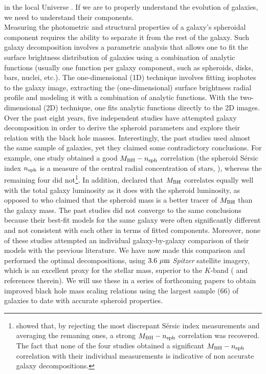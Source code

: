 \documentclass[preprint2]{emulateapj}
\begin{document}
in the local Universe \citep{GDS2015}.
If we are to properly understand the evolution of galaxies, we need to understand their components.\\
Measuring the photometric and structural properties of a galaxy's spheroidal component requires the ability to 
separate it from the rest of the galaxy. 
Such galaxy decomposition involves a parametric analysis that allows one to fit the surface brightness distribution
of galaxies using a combination of analytic functions (usually one function per
galaxy component, such as spheroids, disks, bars, nuclei, etc.).
The one-dimensional (1D) technique involves fitting isophotes to the galaxy image, extracting the (one-dimensional) surface 
brightness radial profile and modeling it with a combination of analytic functions.
With the two-dimensional (2D) technique, one fits analytic functions directly to the 2D images. \\
Over the past eight years, five independent studies 
\citep{grahamdriver2007,sani2011,vika2012,beifiori2012,lasker2014data,lasker2014anal} have attempted galaxy decomposition
in order to derive the spheroid parameters and explore their relation with the black hole masses. 
Interestingly, the past studies used almost the same sample of galaxies, yet they claimed some contradictory conclusions.
For example, one study \citep{grahamdriver2007} obtained a good $M_{\rm BH}-n_{\rm sph}$ correlation 
(the spheroid S\'ersic index $n_{\rm sph}$ is a measure of the central radial concentration of stars, \citealt{trujillo2001}), 
whereas the remaining four did not\footnote{\cite{savorgnan2013} showed that, 
by rejecting the most discrepant S\'ersic index measurements and averaging the remaning ones, 
a strong $M_{\rm BH}-n_{\rm sph}$ correlation was recovered. 
The fact that none of the four studies obtained a significant $M_{\rm BH}-n_{\rm sph}$ correlation with their individual measurements 
is indicative of non accurate galaxy decompositions. }.
In addition, \cite{lasker2014anal} 
declared that $M_{\rm BH}$ correlates equally well with the total galaxy luminosity as it does with the spheroid luminosity, 
as opposed to \cite{beifiori2012} who claimed that the spheroid mass is a better tracer of $M_{\rm BH}$ than the galaxy mass.
The past studies did not converge to the same conclusions 
because their best-fit models for the same galaxy were often 
significantly different and not consistent with each other in terms of fitted components. 
Moreover, none of these studies attempted an individual galaxy-by-galaxy 
comparison of their models with the previous literature. 
We have now made this comparison and performed the optimal decompositions,
using $3.6~\rm \mu m$ \emph{Spitzer} satellite imagery, 
which is an excellent proxy for the stellar mass, superior to the $K$-band (\citealt{sheth2010} and references therein).
We will use these in a series of forthcoming papers to obtain improved black hole mass scaling relations 
using the largest sample (66) of galaxies to date with accurate spheroid properties. \\
\end{document}
